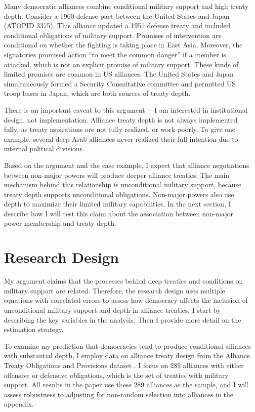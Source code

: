 \documentclass[12pt]{article}
\begin{document}
Many democratic alliances combine conditional military support and high treaty depth. 
Consider a 1960 defense pact between the United States and Japan (ATOPID 3375).
This alliance updated a 1951 defense treaty and included conditional obligations of military support. 
Promises of intervention are conditional on whether the fighting is taking place in East Asia. 
Moreover, the signatories promised action ``to meet the common danger'' if a member is attacked, which is not an explicit promise of military support. 
These kinds of limited promises are common in US alliances. 
The United States and Japan simultaneously formed a Security Consultative committee and permitted US troop bases in Japan, which are both sources of treaty depth. 


There is an important caveat to this argument--- I am interested in institutional design, not implementation.
Alliance treaty depth is not always implemented fully, as treaty aspirations are not fully realized, or work poorly. 
To give one example, several deep Arab alliances never realized their full intention due to internal political divisions.  


Based on the argument and the case example, I expect that alliance negotiations between non-major powers will produce deeper alliance treaties. 
The main mechanism behind this relationship is unconditional military support, because treaty depth supports unconditional obligations. 
Non-major powers also use depth to maximize their limited military capabilities. 
In the next section, I describe how I will test this claim about the association between non-major power membership and treaty depth. 




\section{Research Design}


My argument claims that the processes behind deep treaties and conditions on military support are related. 
Therefore, the research design uses multiple equations with correlated errors to assess how democracy affects the inclusion of unconditional military support and depth in alliance treaties.
I start by describing the key variables in the analysis. 
Then I provide more detail on the estimation strategy. 


To examine my prediction that democracies tend to produce conditional alliances with substantial depth, I employ data on alliance treaty design from the Alliance Treaty Obligations and Provisions dataset \citep{Leedsetal2002}. 
I focus on 289 alliances with either offensive or defensive obligations, which is the set of treaties with military support. 
All results in the paper use these 289 alliances as the sample, and I will assess robustness to adjusting for non-random selection into alliances in the appendix. 
\end{document}
